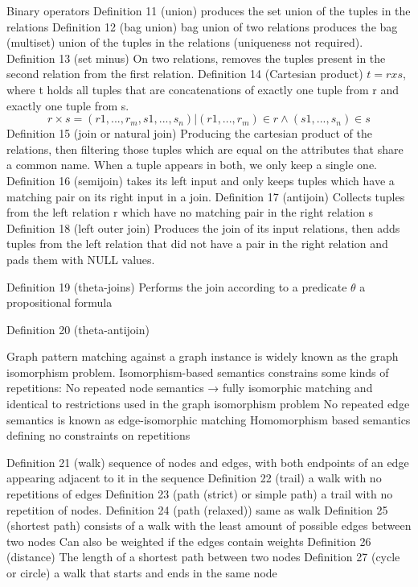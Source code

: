 Binary operators
Definition 11 (union) produces the set union of the tuples in the relations
Definition 12 (bag union) bag union of two relations produces the bag (multiset) union of the tuples in the relations (uniqueness not required). 
Definition 13 (set minus) On two relations, removes the tuples present in the second relation from the first relation. 
Definition 14 (Cartesian product) $t = r x s$, where t holds all tuples that are concatenations of exactly one tuple from r and exactly one tuple from s. 
\begin{equation}
	r \times s = {(r1,..., r_m, s1,..., s_n) | (r1,...,r_m) \in r \wedge (s1,...,s_n) \in s}
\end{equation}
Definition 15 (join or natural join) Producing the cartesian product of the relations, then filtering those tuples which are equal on the attributes that share a common name. When a tuple appears in both, we only keep a single one. 
Definition 16 (semijoin) takes its left input and only keeps tuples which have a matching pair on its right input in a join. 
Definition 17 (antijoin) Collects tuples from the left relation r which have no matching pair in the right relation s
Definition 18 (left outer join) Produces the join of its input relations, then adds tuples from the left relation that did not have a pair in the right relation and pads them with NULL values. 

Definition 19 (theta-joins) Performs the join according to a predicate $\theta$ a propositional formula

Definition 20 (theta-antijoin) 

Graph pattern matching against a graph instance is widely known as the graph isomorphism problem. 
Isomorphism-based semantics constrains some kinds of repetitions: 
No repeated node semantics → fully isomorphic matching and identical to restrictions used in the graph isomorphism problem
No repeated edge semantics is known as edge-isomorphic matching
Homomorphism based semantics defining no constraints on repetitions


Definition 21 (walk) sequence of nodes and edges, with both endpoints of an edge appearing adjacent to it in the sequence
Definition 22 (trail) a walk with no repetitions of edges
Definition 23 (path (strict) or simple path) a trail with no repetition of nodes. 
Definition 24 (path (relaxed)) same as walk
Definition 25 (shortest path) consists of a walk with the least amount of possible edges between two nodes 
	Can also be weighted if the edges contain weights
Definition 26 (distance) The length of a shortest path between two nodes
Definition 27 (cycle or circle) a walk that starts and ends in the same node

